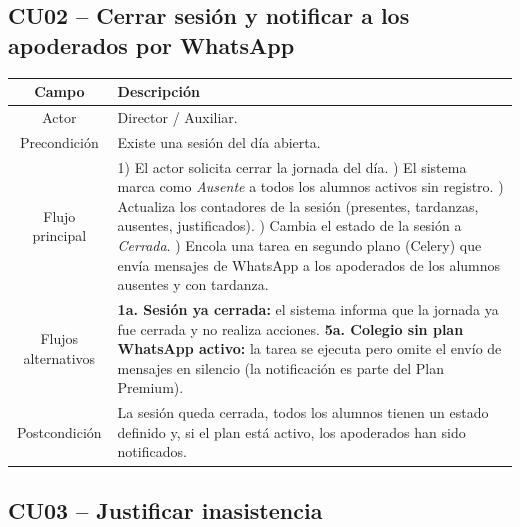 \documentclass[a4paper,12pt]{article}
\begin{document}
\subsection{CU02 -- Cerrar sesión y notificar a los apoderados por WhatsApp}

\begin{table}[H]
\centering
\begin{tabularx}{\linewidth}{C X}
\toprule
\textbf{Campo} & \textbf{Descripción} \\
\midrule
Actor & Director / Auxiliar. \\
\addlinespace
Precondición & Existe una sesión del día abierta. \\
\addlinespace
Flujo principal &
  1) El actor solicita cerrar la jornada del día. ) El sistema marca como \textit{Ausente} a todos los alumnos activos sin
     registro. ) Actualiza los contadores de la sesión (presentes, tardanzas, ausentes,
     justificados). ) Cambia el estado de la sesión a \textit{Cerrada}. ) Encola una tarea en segundo plano (Celery) que envía mensajes de WhatsApp
     a los apoderados de los alumnos ausentes y con tardanza. \\
\addlinespace
Flujos alternativos &
  \textbf{1a. Sesión ya cerrada:} el sistema informa que la jornada ya fue
  cerrada y no realiza acciones. \newline
  \textbf{5a. Colegio sin plan WhatsApp activo:} la tarea se ejecuta pero omite
  el envío de mensajes en silencio (la notificación es parte del Plan
  Premium). \\
\addlinespace
Postcondición &
  La sesión queda cerrada, todos los alumnos tienen un estado definido y, si el
  plan está activo, los apoderados han sido notificados. \\
\bottomrule
\end{tabularx}
\end{table}

\subsection{CU03 -- Justificar inasistencia}
\end{document}
